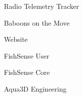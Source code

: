 \item Radio Telemetry Tracker
\item Baboons on the Move
\item Website
\item FishSense User
\item FishSense Core
\item Aqua3D Engineering
